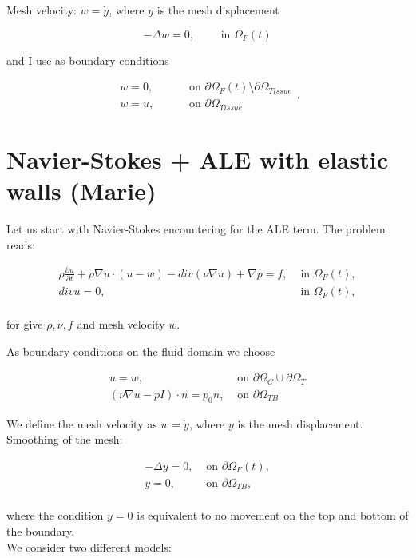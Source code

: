 \documentclass[11pt,a4paper,titlepage]{report}
\begin{document}
Mesh velocity: $w = \dot{y}$, where $y$ is the mesh displacement

\[
-\Delta w = 0, \qquad \text{ in } \Omega_F (t)
\]

and I use as boundary conditions

\[
\begin{aligned}
w = 0, & \qquad \text{ on } \partial \Omega_F (t) \setminus \partial \Omega_{Tissue} \\
w = u, & \qquad \text{ on } \partial \Omega_{Tissue}
\end{aligned}.
\]



\section{Navier-Stokes + ALE with elastic walls (Marie)}
Let us start with Navier-Stokes encountering for the ALE term. The problem reads:

\[
\begin{aligned}
\rho \frac{\partial u}{\partial t} + \rho \nabla u \cdot (u-w) - div(\nu \nabla u) + \nabla p = f  , & \text{ in } \Omega_F (t), \\
div u = 0, & \text{ in } \Omega_F (t), \\
\end{aligned}
\]

for give $\rho, \nu, f$ and mesh velocity $w$.

As boundary conditions on the fluid domain we choose

\[
\begin{aligned}
u = w, & \text{ on } \partial \Omega_C \cup \partial \Omega_T \\
(\nu \nabla u - pI) \cdot n = p_0 n, & \text{ on } \partial \Omega_{TB}
\end{aligned}
\]

We define the mesh velocity as $w = \dot{y}$, where $y$ is the mesh displacement. \\
Smoothing of the mesh:

\[
\begin{aligned}
- \Delta y = 0, & \text{ on } \partial \Omega_F (t), \\
y = 0, & \text{ on } \partial \Omega_{TB}, \\
\end{aligned}
\]

where the condition $y = 0$ is equivalent to no movement on the top and bottom of the boundary. \\
We consider two different models:
\end{document}
